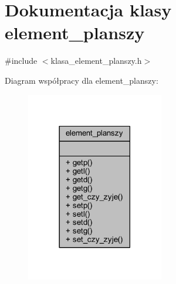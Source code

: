 \hypertarget{classelement__planszy}{}\section{Dokumentacja klasy element\+\_\+planszy}
\label{classelement__planszy}


{\ttfamily \#include $<$klasa\+\_\+element\+\_\+planszy.\+h$>$}



Diagram współpracy dla element\+\_\+planszy\+:
\nopagebreak
\begin{figure}[H]
\begin{center}
\leavevmode
\includegraphics[width=170pt]{classelement__planszy__coll__graph}
\end{center}
\end{figure}
